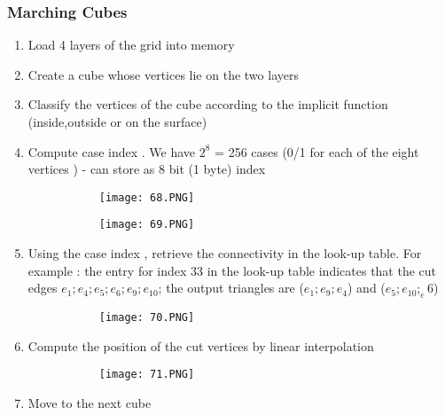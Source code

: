 \documentclass{article}
\begin{document}
\subsubsection{Marching Cubes}
\begin{enumerate}
    \item Load 4 layers of the grid into memory
    \item Create a cube whose vertices lie on the two layers
    \item Classify the vertices of the cube according to the implicit function (inside,outside or on the surface)
    \item Compute case index . We have $2^8$ = 256 cases (0/1 for each of the eight vertices ) - can store as 8 bit (1 byte) index
    
    \begin{figure}[ht!]
  \centering
  \begin{subfigure}[b]{0.29\linewidth}
    \texttt{[image: 68.PNG]}
  \end{subfigure}
  \begin{subfigure}[b]{0.7\textwidth}
         \centering
         \texttt{[image: 69.PNG]}
     \end{subfigure}
\end{figure}
    \item Using the case index , retrieve the connectivity in the look-up table. For example : the entry for index 33 in the look-up table indicates that the cut edges $e_1;e_4;e_5;e_6;e_9;e_10$; the output triangles are ($e_1;e_9;e_4$) and ($e_5;e_10;_e6$)
    
   \begin{figure}[ht!]
  \centering
  \begin{subfigure}[b]{0.6\linewidth}
    \texttt{[image: 70.PNG]}
  \end{subfigure}
\end{figure} 
    
    \item Compute the position of the cut vertices by linear interpolation
    
     \begin{figure}[ht!]
  \centering
  \begin{subfigure}[b]{0.5\linewidth}
    \texttt{[image: 71.PNG]}
  \end{subfigure}
\end{figure} 
    
    
    \item Move to the next cube
    
\end{enumerate}
\end{document}
